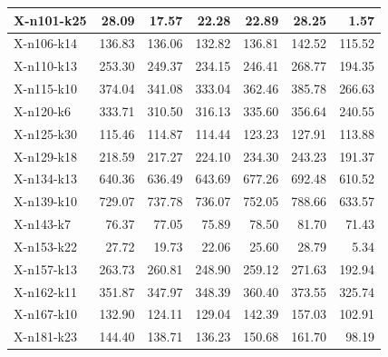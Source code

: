 \documentclass[12pt,a4paper,oneside]{book}
\begin{document}
\begin{table}[]
\begin{tabular}{|l|r|r|r|r|r|r|}
X-n101-k25               & 28.09           & 17.57           & 22.28           & 22.89           & 28.25           & 1.57            \\ \hline
X-n106-k14               & 136.83          & 136.06          & 132.82          & 136.81          & 142.52          & 115.52          \\ \hline
X-n110-k13               & 253.30           & 249.37          & 234.15          & 246.41          & 268.77          & 194.35          \\ \hline
X-n115-k10               & 374.04          & 341.08          & 333.04          & 362.46          & 385.78          & 266.63          \\ \hline
X-n120-k6                & 333.71          & 310.50           & 316.13          & 335.60           & 356.64          & 240.55          \\ \hline
X-n125-k30               & 115.46          & 114.87          & 114.44          & 123.23          & 127.91          & 113.88          \\ \hline
X-n129-k18               & 218.59          & 217.27          & 224.10           & 234.30           & 243.23          & 191.37          \\ \hline
X-n134-k13               & 640.36          & 636.49          & 643.69          & 677.26          & 692.48          & 610.52          \\ \hline
X-n139-k10               & 729.07          & 737.78          & 736.07          & 752.05          & 788.66          & 633.57          \\ \hline
X-n143-k7                & 76.37           & 77.05           & 75.89           & 78.50            & 81.70            & 71.43           \\ \hline
X-n153-k22               & 27.72           & 19.73           & 22.06           & 25.60            & 28.79           & 5.34            \\ \hline
X-n157-k13               & 263.73          & 260.81          & 248.90           & 259.12          & 271.63          & 192.94          \\ \hline
X-n162-k11               & 351.87          & 347.97          & 348.39          & 360.40           & 373.55          & 325.74          \\ \hline
X-n167-k10               & 132.90           & 124.11          & 129.04          & 142.39          & 157.03          & 102.91          \\ \hline
X-n181-k23               & 144.40           & 138.71          & 136.23          & 150.68          & 161.70           & 98.19           \\ \hline

\end{tabular}
\end{table}
\end{document}

